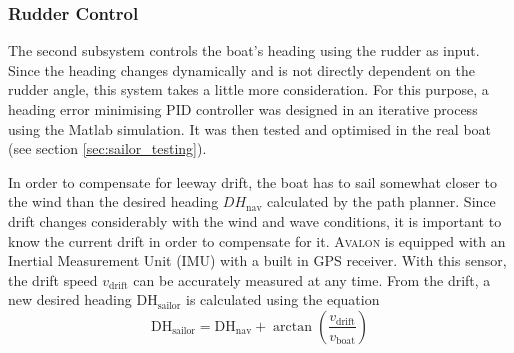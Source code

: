 \subsubsection{Rudder Control}
The second subsystem controls the boat's heading using the rudder as input.
Since the heading changes dynamically and is not directly dependent on the
rudder angle, this system takes a little more consideration. For this purpose,
a heading error minimising PID controller was designed in an iterative process using the Matlab
simulation. It was then tested and optimised in the real boat (see section
\ref{sec:sailor_testing}).

In order to compensate for leeway drift, the boat has to sail somewhat closer
to the wind than the desired heading $DH_{\text{nav}}$ calculated by the path
planner.
Since drift changes considerably with the wind and wave conditions, it is
important to know the current drift in order to compensate for it. \textsc{Avalon}
is equipped with an Inertial Measurement Unit (IMU) with a built in GPS
receiver. With this sensor, the drift speed $v_{\text{drift}}$ can be accurately
measured at any time. From the drift, a new desired heading DH$_{\text{sailor}}$ is
calculated using the equation
\begin{equation}
  \text{DH}_{\text{sailor}} = \text{DH}_{\text{nav}} + \arctan\left( \frac{v_{\text{drift}}}{v_{\text{boat}}} \right)
\end{equation}

